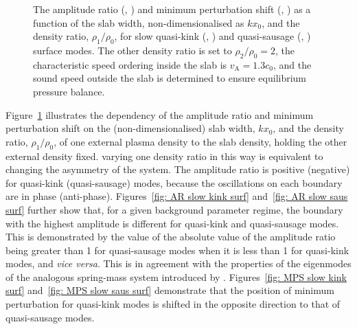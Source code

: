 \documentclass[namedreferences]{solarphysics}
\numberwithin{equation}{section}
\begin{document}
\begin{article}
\begin{figure}
{\label{fig: MPS slow kink surf}}
\caption{The amplitude ratio (\protect{}, \protect{}) and minimum perturbation shift (\protect{}, \protect{}) as a function of the slab width, non-dimensionalised as $kx_0$, and the density ratio, $\rho_1/\rho_0$, for slow quasi-kink (\protect{}, \protect{}) and quasi-sausage (\protect{}, \protect{}) surface modes. The other density ratio is set to $\rho_2/\rho_0 = 2$, the characteristic speed ordering inside the slab is $v_\textrm{A}=1.3c_0$, and the sound speed outside the slab is determined to ensure equilibrium pressure balance.}
\label{fig: AR MPS}
\end{figure}

Figure~\ref{fig: AR MPS} illustrates the dependency of the amplitude ratio and minimum perturbation shift on the (non-dimensionalised) slab width, $kx_0$, and the density ratio, $\rho_1/\rho_0$, of one external plasma density to the slab density, holding the other external density fixed. varying one density ratio in this way is equivalent to changing the asymmetry of the system. The amplitude ratio is positive (negative) for quasi-kink (quasi-sausage) modes, because the oscillations on each boundary are in phase (anti-phase). Figures~\ref{fig: AR slow kink surf} and~\ref{fig: AR slow saus surf} further show that, for a given background parameter regime, the boundary with the highest amplitude is different for quasi-kink and quasi-sausage modes. This is demonstrated by the value of the absolute value of the amplitude ratio being greater than 1 for quasi-sausage modes when it is less than 1 for quasi-kink modes, and \textit{vice versa}. This is in agreement with the properties of the eigenmodes of the analogous spring-mass system introduced by \cite{all_etal17}. Figures~\ref{fig: MPS slow kink surf} and~\ref{fig: MPS slow saus surf} demonstrate that the position of minimum perturbation for quasi-kink modes is shifted in the opposite direction to that of quasi-sausage modes.


\end{article}
\end{document}
